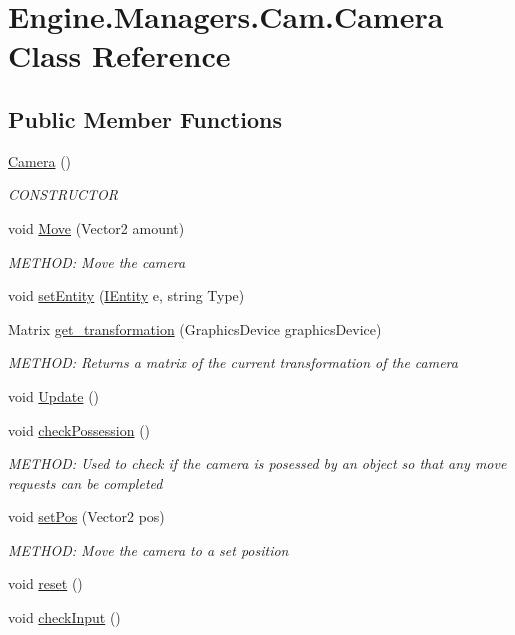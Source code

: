 \hypertarget{a00490}{}\section{Engine.\+Managers.\+Cam.\+Camera Class Reference}
\label{a00490}
\subsection*{Public Member Functions}
\begin{DoxyCompactItemize}
\item 
\hyperlink{a00490_aa95d077fcb6779cf1d05dcd3924e47fd}{Camera} ()
\begin{DoxyCompactList}\small\item\em C\+O\+N\+S\+T\+R\+U\+C\+T\+OR \end{DoxyCompactList}\item 
void \hyperlink{a00490_aed786ac2b98679e90e3cc3fe5189f84e}{Move} (Vector2 amount)
\begin{DoxyCompactList}\small\item\em M\+E\+T\+H\+OD\+: Move the camera \end{DoxyCompactList}\item 
void \hyperlink{a00490_a7ba71eb9f006ab215b884763111c64f0}{set\+Entity} (\hyperlink{a00438}{I\+Entity} e, string Type)
\item 
Matrix \hyperlink{a00490_af3d0a20954c676fc8d14467fa6a3ed9f}{get\+\_\+transformation} (Graphics\+Device graphics\+Device)
\begin{DoxyCompactList}\small\item\em M\+E\+T\+H\+OD\+: Returns a matrix of the current transformation of the camera \end{DoxyCompactList}\item 
void \hyperlink{a00490_a40c128b7756087b2af6b3c3d62f83d08}{Update} ()
\item 
void \hyperlink{a00490_a77490f1a670ff106e843a46a712c9929}{check\+Possession} ()
\begin{DoxyCompactList}\small\item\em M\+E\+T\+H\+OD\+: Used to check if the camera is posessed by an object so that any move requests can be completed \end{DoxyCompactList}\item 
void \hyperlink{a00490_a93b217a61f0e87a0d184db27f7c0c1e7}{set\+Pos} (Vector2 pos)
\begin{DoxyCompactList}\small\item\em M\+E\+T\+H\+OD\+: Move the camera to a set position \end{DoxyCompactList}\item 
void \hyperlink{a00490_ae78f05538144a4613e5a601509482eea}{reset} ()
\item 
void \hyperlink{a00490_a87b553b3288448c4d6fe055398faa363}{check\+Input} ()
\end{DoxyCompactItemize}
